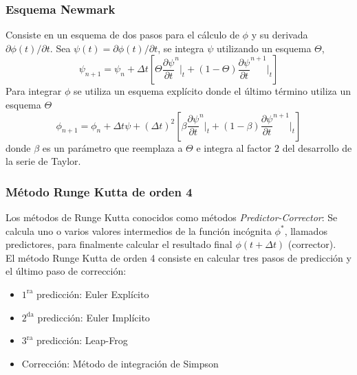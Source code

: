 \subsubsection{Esquema Newmark} \label{esquema_newmark_seccion}
Consiste en un esquema de dos pasos para el cálculo de $\phi$ y su derivada $\partial \phi (t) / \partial t$. Sea $\psi(t) = \partial \phi(t) / \partial t$, se integra $\psi$ utilizando un esquema $\Theta$,
\begin{equation} \label{newmark_v}
\psi_{n+1} = \psi_n + \Delta t \left[ \Theta \dfrac{\partial \psi}{\partial t}^{n} \Big|_t + (1-\Theta) \dfrac{\partial \psi}{\partial t}^{n+1} \Big|_t \right]
\end{equation}
Para integrar $\phi$ se utiliza un esquema explícito donde el último término utiliza un esquema $\Theta$
\begin{equation} \label{newmark_u}
\phi_{n+1} = \phi_n + \Delta t \psi + (\Delta t)^2 \left[ \beta \dfrac{\partial \psi}{\partial t}^n \Big|_t + (1-\beta) \dfrac{\partial \psi}{\partial t}^{n+1} \Big|_t \right]
\end{equation}
donde $\beta$ es un parámetro que reemplaza a $\Theta$ e integra al factor $2$ del desarrollo de la serie de Taylor.

\subsubsection{Método Runge Kutta de orden 4}
Los métodos de Runge Kutta conocidos como métodos \textit{Predictor-Corrector}: Se calcula uno o varios valores intermedios de la función incógnita $\phi^*$, llamados predictores, para finalmente calcular el resultado final $\phi(t+\Delta t)$ (corrector). \\

El método Runge Kutta de orden 4 consiste en calcular tres pasos de predicción y el último paso de corrección:

\begin{itemize}
\item $1^{\mbox{ra}}$ predicción: Euler Explícito \vspace{-0,2cm}
\item $2^{\mbox{da}}$ predicción: Euler Implícito \vspace{-0,2cm}
\item $3^{\mbox{ra}}$ predicción: Leap-Frog \vspace{-0,2cm}
\item Corrección: Método de integración de Simpson 
\end{itemize}

